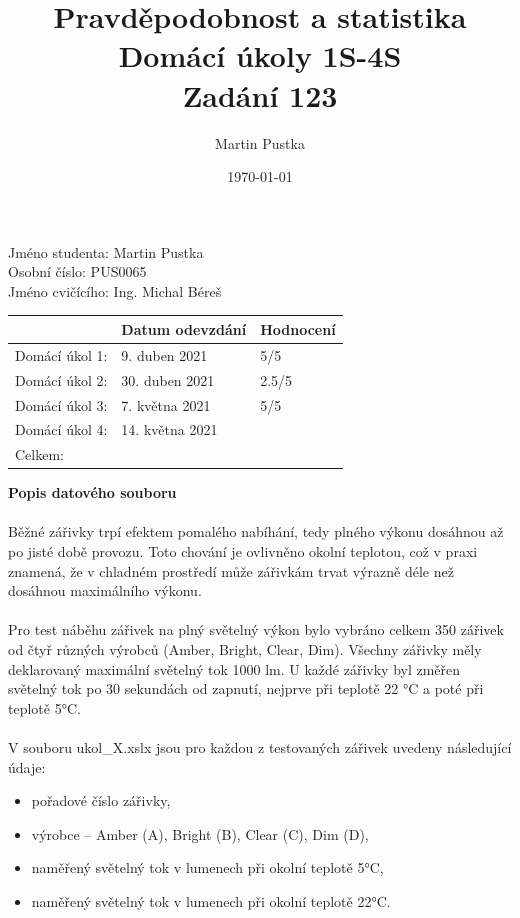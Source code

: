 \documentclass[czech]{article}%
\title{Pravděpodobnost a statistika\\
    \large Domácí úkoly 1S-4S\\
    \large Zadání 123}
\author{Martin Pustka}
\date{\today}
\begin{document}
\maketitle

\noindent
Jméno studenta: Martin Pustka\\
Osobní číslo: PUS0065\\
Jméno cvičícího: Ing. Michal Béreš\\

\begin{table}[!b]
    \centering
    \begin{tabular}{|l|p{5cm}|p{3cm}|}
        \hline
        & Datum odevzdání & Hodnocení \\
        \hline
        Domácí úkol 1: & 9. duben 2021 & 5/5 \\
        \hline
        Domácí úkol 2: & 30. duben 2021 & 2.5/5\\
        \hline
        Domácí úkol 3: & 7. května 2021 & 5/5\\
        \hline
        Domácí úkol 4: & 14. května 2021& \\
        \hline
        Celkem: & & \\
        \hline
    \end{tabular}
\end{table}
\newpage
\tableofcontents
\newpage

\noindent
\textbf{Popis datového souboru}
\\\\
\noindent
Běžné zářivky trpí efektem pomalého nabíhání, tedy plného výkonu dosáhnou až po jisté době provozu. Toto chování je ovlivněno okolní teplotou, což v praxi znamená, že v chladném prostředí může zářivkám trvat výrazně déle než dosáhnou maximálního výkonu. 
\\\\
\noindent
Pro test náběhu zářivek na plný světelný výkon bylo vybráno celkem 350 zářivek od čtyř různých výrobců (Amber, Bright, Clear, Dim). Všechny zářivky měly deklarovaný maximální světelný tok 1000 lm. U každé zářivky byl změřen světelný tok po 30 sekundách od zapnutí, nejprve při teplotě 22 °C a poté při teplotě 5°C.
\\\\
\noindent
V souboru ukol\_X.xslx jsou pro každou z testovaných zářivek uvedeny následující údaje:
\begin{itemize}
    \item pořadové číslo zářivky,
    \item výrobce – Amber (A), Bright (B), Clear (C), Dim (D),
    \item naměřený světelný tok v lumenech při okolní teplotě 5°C,
    \item naměřený světelný tok v lumenech při okolní teplotě 22°C.
\end{itemize}
\end{document}
